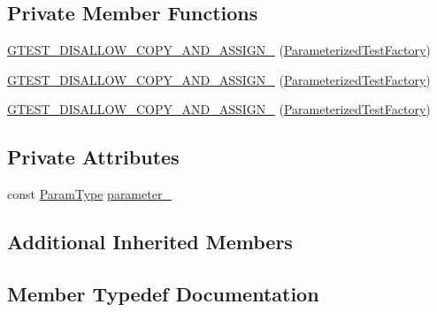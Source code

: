 \subsection*{Private Member Functions}
\begin{DoxyCompactItemize}
\item 
\mbox{\hyperlink{classtesting_1_1internal_1_1_parameterized_test_factory_ac70e70bd61d0f66bbc68ed2587c42d92}{G\+T\+E\+S\+T\+\_\+\+D\+I\+S\+A\+L\+L\+O\+W\+\_\+\+C\+O\+P\+Y\+\_\+\+A\+N\+D\+\_\+\+A\+S\+S\+I\+G\+N\+\_\+}} (\mbox{\hyperlink{classtesting_1_1internal_1_1_parameterized_test_factory}{Parameterized\+Test\+Factory}})
\item 
\mbox{\hyperlink{classtesting_1_1internal_1_1_parameterized_test_factory_ac70e70bd61d0f66bbc68ed2587c42d92}{G\+T\+E\+S\+T\+\_\+\+D\+I\+S\+A\+L\+L\+O\+W\+\_\+\+C\+O\+P\+Y\+\_\+\+A\+N\+D\+\_\+\+A\+S\+S\+I\+G\+N\+\_\+}} (\mbox{\hyperlink{classtesting_1_1internal_1_1_parameterized_test_factory}{Parameterized\+Test\+Factory}})
\item 
\mbox{\hyperlink{classtesting_1_1internal_1_1_parameterized_test_factory_ac70e70bd61d0f66bbc68ed2587c42d92}{G\+T\+E\+S\+T\+\_\+\+D\+I\+S\+A\+L\+L\+O\+W\+\_\+\+C\+O\+P\+Y\+\_\+\+A\+N\+D\+\_\+\+A\+S\+S\+I\+G\+N\+\_\+}} (\mbox{\hyperlink{classtesting_1_1internal_1_1_parameterized_test_factory}{Parameterized\+Test\+Factory}})
\end{DoxyCompactItemize}
\subsection*{Private Attributes}
\begin{DoxyCompactItemize}
\item 
const \mbox{\hyperlink{classtesting_1_1internal_1_1_parameterized_test_factory_ad9a27b8e1a83de2f1687625bccff460d}{Param\+Type}} \mbox{\hyperlink{classtesting_1_1internal_1_1_parameterized_test_factory_a9ee3e72cb3b169924b5328009ed48b5e}{parameter\+\_\+}}
\end{DoxyCompactItemize}
\subsection*{Additional Inherited Members}


\subsection{Member Typedef Documentation}
\mbox{\label{classtesting_1_1internal_1_1_parameterized_test_factory_ad9a27b8e1a83de2f1687625bccff460d}} 
